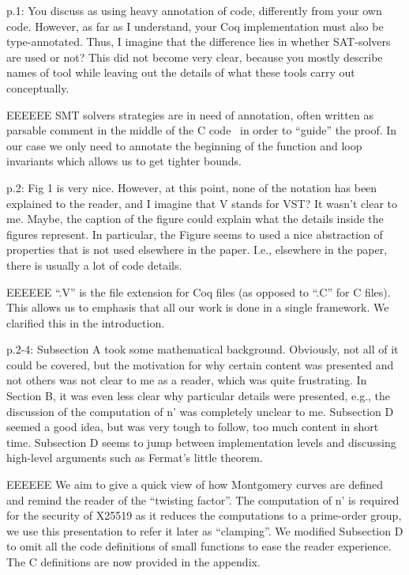 p.1: You discuss \cite{Ber06} as using heavy annotation of code,
differently from your own code. However, as far as I understand,
your Coq implementation must also be type-annotated. Thus,
I imagine that the difference lies in whether SAT-solvers are
used or not? This did not become very clear, because you
mostly describe names of tool while leaving out the details of
what these tools carry out conceptually.

\begin{answer}{EEEEEE}
SMT solvers strategies are in need of annotation, often written
as parsable comment in the middle of the C code~\cite{acsl}
in order to ``guide'' the proof. In our case we only need to
annotate the beginning of the function and loop invariants
which allows us to get tighter bounds.
\end{answer}

p.2: Fig 1 is very nice. However, at this point, none of
the notation has been explained to the reader, and I imagine
that V stands for VST? It wasn't clear to me. Maybe, the
caption of the figure could explain what the details inside the
figures represent. In particular, the Figure seems to used a
nice abstraction of properties that is not used elsewhere in
the paper. I.e., elsewhere in the paper, there is usually a lot
of code details.

\begin{answer}{EEEEEE}
``.V'' is the file extension for Coq files (as opposed to ``.C'' for C
files). This allows us to emphasis that all our work is done
in a single framework. We clarified this in the introduction.
\end{answer}

p.2-4: Subsection A took some mathematical background.
Obviously, not all of it could be covered, but the motivation
for why certain content was presented and not others was not
clear to me as a reader, which was quite frustrating. In Section
B, it was even less clear why particular details were presented,
e.g., the discussion of the computation of n’ was completely
unclear to me. Subsection D seemed a good idea, but was very
tough to follow, too much content in short time. Subsection D
seems to jump between implementation levels and discussing
high-level arguments such as Fermat’s little theorem.

\begin{answer}{EEEEEE}
We aim to give a quick view of how Montgomery curves are
defined and remind the reader of the ``twisting factor''. The
computation of n' is required for the security of X25519 as
it reduces the computations to a prime-order group, we use
this presentation to refer it later as ``clamping''. We
modified Subsection D to omit all the code definitions of small
functions to ease the reader experience. The C definitions
are now provided in the appendix.
\end{answer}

